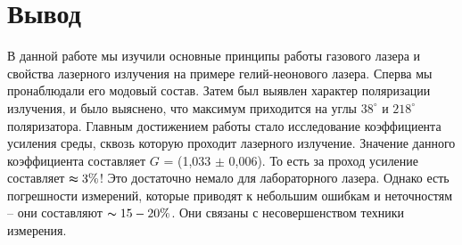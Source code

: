 \documentclass[a4paper,12pt]{article} %
\begin{document}
	\vspace{30mm}
	\section*{Вывод}
	В данной работе мы изучили основные принципы работы газового лазера и свойства лазерного излучения на примере гелий-неонового лазера. Сперва мы пронаблюдали его модовый состав. Затем был выявлен характер поляризации излучения, и было выяснено, что максимум приходится на углы $38^\circ$ и $218^\circ$ поляризатора. Главным достижением работы стало исследование коэффициента усиления среды, сквозь которую проходит лазерного излучение. Значение данного коэффициента составляет $G$ = (1,033 $\pm$ 0,006). То есть за проход усиление составляет $\thickapprox 3\%$! Это достаточно немало для лабораторного лазера. Однако есть погрешности измерений, которые приводят к небольшим ошибкам и неточностям -- они составляют $\thicksim 15-20\%$. Они связаны с несовершенством техники измерения. 
\end{document}

